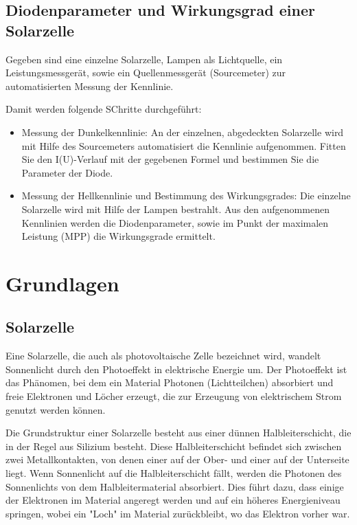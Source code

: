 \documentclass[12pt,english,ngerman]{scrartcl}
\begin{document}
\subsection{Diodenparameter und Wirkungsgrad einer Solarzelle}

Gegeben sind eine einzelne Solarzelle, Lampen als Lichtquelle, ein Leistungsmessgerät, 
sowie ein Quellenmessgerät (Sourcemeter) zur automatisierten Messung der Kennlinie.

Damit werden folgende SChritte durchgeführt:

\begin{itemize}
	\item Messung der Dunkelkennlinie: An der einzelnen, abgedeckten Solarzelle wird mit Hilfe des Sourcemeters 
	automatisiert die Kennlinie aufgenommen. Fitten Sie den I(U)-Verlauf mit der gegebenen Formel und bestimmen 
	Sie die Parameter der Diode.
	\item Messung der Hellkennlinie und Bestimmung des Wirkungsgrades: Die einzelne Solarzelle wird mit Hilfe 
	der Lampen bestrahlt. Aus den aufgenommenen Kennlinien werden die Diodenparameter, sowie im Punkt der 
	maximalen Leistung (MPP) die Wirkungsgrade ermittelt.
\end{itemize}

\section{Grundlagen}\label{Grund}

\subsection{Solarzelle}
Eine Solarzelle, die auch als photovoltaische Zelle bezeichnet wird, wandelt
Sonnenlicht durch den Photoeffekt in elektrische Energie um. Der Photoeffekt
ist das Phänomen, bei dem ein Material Photonen (Lichtteilchen) absorbiert und
freie Elektronen und Löcher erzeugt, die zur Erzeugung von elektrischem Strom
genutzt werden können.

Die Grundstruktur einer Solarzelle besteht aus einer dünnen Halbleiterschicht,
die in der Regel aus Silizium besteht. Diese Halbleiterschicht befindet sich
zwischen zwei Metallkontakten, von denen einer auf der Ober- und einer auf der
Unterseite liegt. Wenn Sonnenlicht auf die Halbleiterschicht fällt, werden die
Photonen des Sonnenlichts von dem Halbleitermaterial absorbiert. Dies führt
dazu, dass einige der Elektronen im Material angeregt werden und auf ein
höheres Energieniveau springen, wobei ein "Loch" im Material zurückbleibt, wo
das Elektron vorher war.
\end{document}
